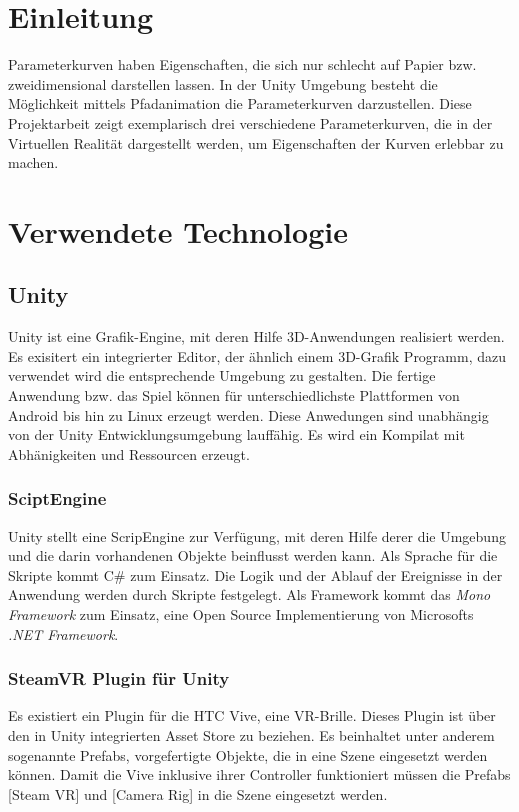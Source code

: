 
\chapter{Einleitung}
\label{Einleitung}

Parameterkurven haben Eigenschaften, die sich nur schlecht auf Papier bzw. zweidimensional darstellen lassen.
In der Unity Umgebung besteht die Möglichkeit mittels Pfadanimation die Parameterkurven darzustellen. 
Diese Projektarbeit zeigt exemplarisch drei verschiedene Parameterkurven, die in der Virtuellen Realität dargestellt werden, um Eigenschaften der Kurven erlebbar zu machen. 

\chapter{Verwendete Technologie}
\label{Technologie}
\section{Unity}
Unity ist eine Grafik-Engine, mit deren Hilfe 3D-Anwendungen realisiert werden. Es exisitert ein integrierter Editor, der ähnlich einem 3D-Grafik Programm, dazu verwendet wird die entsprechende Umgebung zu gestalten. Die fertige Anwendung bzw. das Spiel können für unterschiedlichste Plattformen von Android bis hin zu Linux erzeugt werden. Diese Anwedungen sind unabhängig von der Unity Entwicklungsumgebung lauffähig. Es wird ein Kompilat mit Abhänigkeiten und Ressourcen erzeugt.

\subsection{SciptEngine}
Unity stellt eine ScripEngine zur Verfügung, mit deren Hilfe derer die Umgebung und die darin vorhandenen Objekte beinflusst werden kann. Als Sprache für die Skripte kommt C\# zum Einsatz. Die Logik und der Ablauf der Ereignisse in der Anwendung werden durch Skripte festgelegt. Als Framework kommt das \emph{Mono Framework} zum Einsatz, eine Open Source Implementierung von Microsofts \emph{.NET Framework}.

\subsection{SteamVR Plugin für Unity}
Es existiert ein Plugin für die HTC Vive, eine VR-Brille. Dieses Plugin ist über den in Unity integrierten Asset Store zu beziehen. Es beinhaltet unter anderem sogenannte Prefabs, vorgefertigte Objekte, die in eine Szene eingesetzt werden können. Damit die Vive inklusive ihrer Controller funktioniert müssen die Prefabs [Steam VR] und [Camera Rig] in die Szene eingesetzt werden. 

